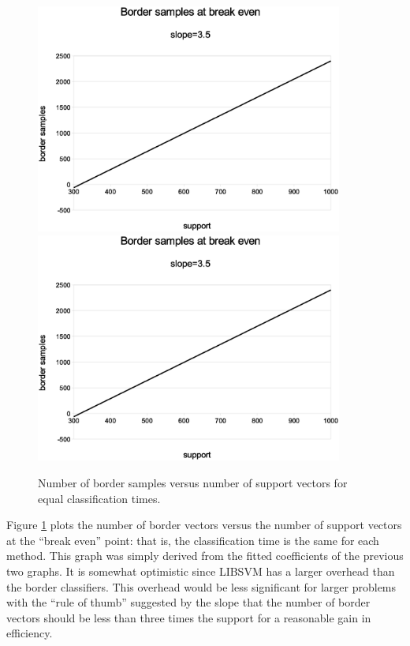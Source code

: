 \begin{figure}
  \ifsubmit
    \includegraphics[width=0.9\textwidth]{break_even}
  \else
    \includegraphics[width=0.9\textwidth]{../break_even}
  \fi
\caption{Number of border samples versus number of support vectors for equal classification times.}
\label{break_even}
\end{figure}

Figure \ref{break_even} plots the number of border vectors versus the number
of support vectors at the ``break even'' point: that is, the classification
time is the same for each method.
This graph was simply derived from the fitted coefficients of the previous
two graphs.
It is somewhat optimistic
since LIBSVM has a larger overhead than the border classifiers.
This overhead would be less significant for larger problems 
with the ``rule of thumb'' suggested by the slope 
that the number of border vectors should be less than three times the support
for a reasonable gain in efficiency.

